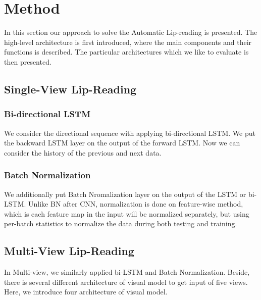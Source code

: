 \section{Method}
\label{sec:method}

In this section our approach to solve the Automatic Lip-reading is presented.
The high-level architecture is first introduced, where the main components and their functions is described.
The particular architectures which we like to evaluate is then presented.

\subsection{Single-View Lip-Reading}

\subsubsection{Bi-directional LSTM}
We consider the directional sequence with applying bi-directional LSTM. We put the backward LSTM layer on the output of the forward LSTM. Now we can consider the history of the previous and next data.



\subsubsection{Batch Normalization}
We additionally put Batch Nromalization layer on the output of the LSTM or bi-LSTM. Unlike BN after CNN, normalization is done on feature-wise method, which is each feature map in the input will be normalized separately, but using per-batch statistics to normalize the data during both testing and training.

\subsection{Multi-View Lip-Reading}
In Multi-view, we similarly applied bi-LSTM and Batch Normalization. Beside, there is several different architecture of visual model to get input of five views. Here, we introduce four architecture of visual model. 
